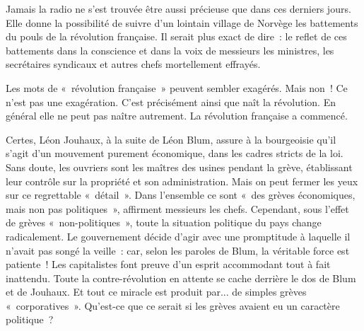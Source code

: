 \documentclass[french,twoside]{book} %
\newcommand\chaptercont{} %
\begin{document}
\chaptercont
\noindent Jamais la radio ne s’est trouvée être aussi précieuse que dans ces derniers jours. Elle donne la possibilité de suivre d’un lointain village de Norvège les battements du pouls de la révolution française. Il serait plus exact de dire : le reflet de ces battements dans la conscience et dans la voix de messieurs les ministres, les secrétaires syndicaux et autres chefs mortellement effrayés.\par
Les mots de « révolution française » peuvent sembler exagérés. Mais non ! Ce n’est pas une exagération. C’est précisément ainsi que naît la révolution. En général elle ne peut pas naître autrement. La révolution française a commencé.\par
Certes, Léon Jouhaux, à la suite de Léon Blum, assure à la bourgeoisie qu’il s’agit d’un mouvement purement économique, dans les cadres stricts de la loi. Sans doute, les ouvriers sont les maîtres des usines pendant la grève, établissant leur contrôle sur la propriété et son administration. Mais on peut fermer les yeux sur ce regrettable « détail ». Dans l’ensemble ce sont « des grèves économiques, mais non pas politiques », affirment messieurs les chefs. Cependant, sous l’effet de grèves « non-politiques », toute la situation politique du pays change radicalement. Le gouvernement décide d’agir avec une promptitude à laquelle il n’avait pas songé la veille : car,  selon les paroles de Blum, la véritable force est patiente ! Les capitalistes font preuve d’un esprit accommodant tout à fait inattendu. Toute la contre-révolution en attente se cache derrière le dos de Blum et de Jouhaux. Et tout ce miracle est produit par... de simples grèves « corporatives ». Qu’est-ce que ce serait si les grèves avaient eu un caractère politique ?\par
\end{document}
